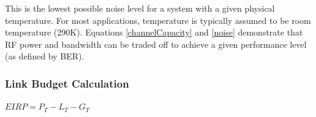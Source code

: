 This is the lowest possible noise level for a system with a given physical temperature. For most applications, temperature is typically assumed to be room temperature (290K). Equations \ref{channelCapacity} and \ref{noise} demonstrate that RF power and bandwidth can be traded off to achieve a given performance level (as defined by BER).

\subsubsection{Link Budget Calculation}
$EIRP=P_T-L_T-G_T$

